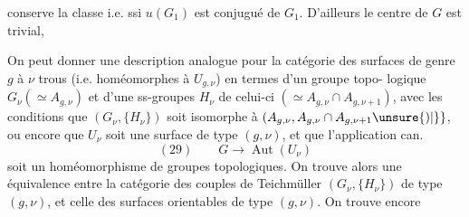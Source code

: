 conserve la classe  i.e. ssi $u(G_1)$ est conjugué
de $G_1$. D'ailleurs le centre de $G$ est trivial, 

On peut donner une description analogue
pour la catégorie des surfaces  de
genre $g$ à $\nu$ trous (i.e. homéomorphes
à $U_{g,\nu}$) en termes d'un groupe topo-
logique $G_\nu(\simeq A_{g,\nu})$ et d'une 
ss-groupes $H_\nu$ de celui-ci $(\simeq A_{g,\nu}\cap A_{g,\nu+1})$, avec les
conditions que $(G_\nu,\{H_\nu\})$ soit isomorphe
à $(A_{g,\nu},A_{g,\nu}\cap A_{g,\nu+1}\unsure{)|\}}$, ou encore
que $U_\nu$  soit une surface  de
type $(g,\nu)$, et que l'application can.
\[
(29)\qquad G\longrightarrow\operatorname{Aut}(U_\nu)
\]
soit un homéomorphisme de groupes
topologiques. On trouve alors une
équivalence entre la catégorie des
couples de Teichmüller $(G_\nu,\{H_\nu\})$
de type $(g,\nu)$, et celle des surfaces
orientables de type $(g,\nu)$. On trouve encore
